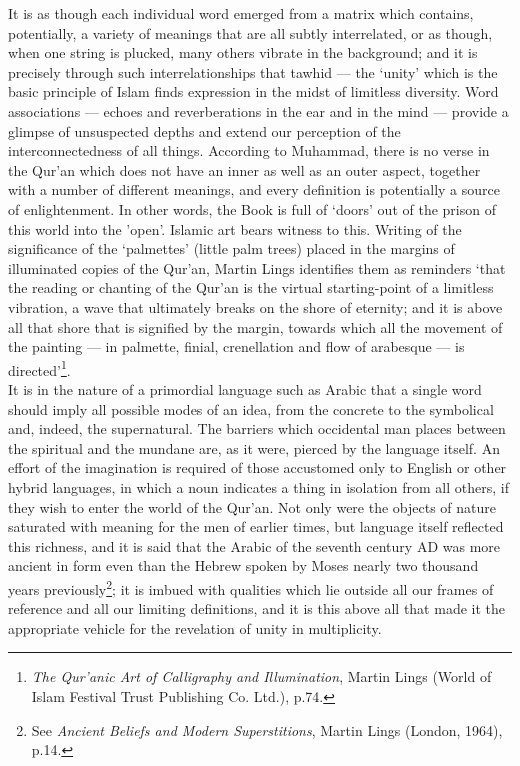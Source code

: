 \documentclass[10pt, twoside]{book}
\begin{document}
It is as though each individual word emerged from a matrix which contains, potentially, a variety of 
meanings that are all subtly interrelated, or as though, when one string is plucked, many others 
vibrate in the background; and it is precisely through such interrelationships that tawhid --- the 
`unity' which is the basic principle of Islam finds expression in the midst of limitless diversity. 
Word associations --- echoes and reverberations in the ear and in the mind --- provide a glimpse of 
unsuspected depths and extend our perception of the interconnectedness of all things. According to 
Muhammad, there is no verse in the Qur'an which does not have an inner as well as an outer aspect, 
together with a number of different meanings, and every definition is potentially a source of 
enlightenment. In other words, the Book is full of `doors' out of the prison of this world into the 
'open'. Islamic art bears witness to this. Writing of the significance of the `palmettes' (little 
palm trees) placed in the margins of illuminated copies of the Qur'an, Martin Lings identifies them 
as reminders `that the reading or chanting of the Qur'an is the virtual starting-point of a limitless 
vibration, a wave that ultimately breaks on the shore of eternity; and it is above all that shore 
that is signified by the margin, towards which all the movement of the painting --- in palmette, 
finial, crenellation and flow of arabesque --- is directed'\footnote{\emph{The Qur'anic Art of Calligraphy and Illumination}, Martin Lings (World of Islam Festival Trust Publishing Co. Ltd.), p.74.}. \\

It is in the nature of a primordial language such as Arabic that a single word should imply all 
possible modes of an idea, from the concrete to the symbolical and, indeed, the supernatural. The 
barriers which occidental man places between the spiritual and the mundane are, as it were, pierced 
by the language itself. An effort of the imagination is required of those accustomed only to English 
or other hybrid languages, in which a noun indicates a thing in isolation from all others, if they 
wish to enter the world of the Qur'an. Not only were the objects of nature saturated with meaning for 
the men of earlier times, but language itself reflected this richness, and it is said that the Arabic 
of the seventh century AD was more ancient in form even than the Hebrew spoken by Moses nearly two 
thousand years previously\footnote{See \emph{Ancient Beliefs and Modern Superstitions}, Martin Lings (London, 1964), p.14.}; it is imbued with qualities which lie outside all our frames of reference and all our limiting definitions, and it is this above all that made it the appropriate vehicle for the revelation of unity in multiplicity. \\
\end{document}
